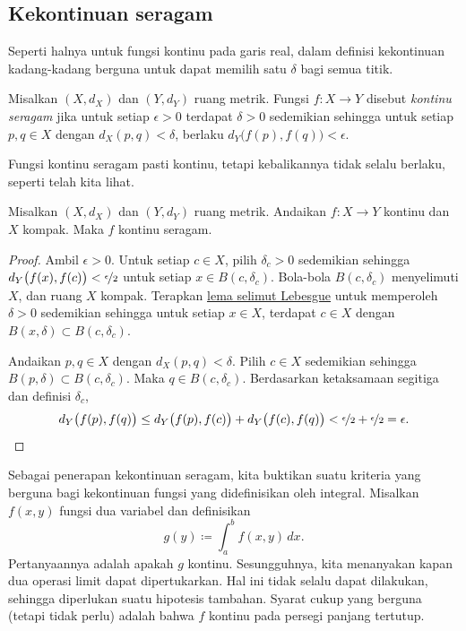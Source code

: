 \subsection{Kekontinuan seragam}

Seperti halnya untuk fungsi kontinu
pada garis real, dalam definisi kekontinuan
kadang-kadang berguna untuk dapat memilih
satu $\delta$ bagi semua titik.

\begin{defn}
Misalkan $(X,d_X)$ dan $(Y,d_Y)$ ruang metrik.
Fungsi $f \colon X \to Y$ disebut
\emph{kontinu seragam}
jika untuk setiap $\epsilon > 0$
terdapat $\delta > 0$ sedemikian sehingga untuk setiap $p,q \in X$ dengan $d_X(p,q) <
\delta$, berlaku
$d_Y\bigl(f(p),f(q)\bigr) < \epsilon$.
\end{defn}

Fungsi kontinu seragam pasti kontinu, tetapi kebalikannya tidak selalu
berlaku, seperti telah kita lihat.

\begin{thm} \label{thm:Xcompactfunifcont}
Misalkan $(X,d_X)$ dan $(Y,d_Y)$ ruang metrik.
Andaikan $f \colon X \to Y$ kontinu dan $X$ kompak.  Maka
$f$ kontinu seragam.
\end{thm}

\begin{proof}
Ambil $\epsilon > 0$.  Untuk setiap $c \in X$, pilih $\delta_c > 0$ sedemikian sehingga
$d_Y\bigl(f(x),f(c)\bigr) < \nicefrac{\epsilon}{2}$
untuk setiap
$x \in B(c,\delta_c)$.
Bola-bola
$B(c,\delta_c)$ menyelimuti $X$, dan ruang $X$ kompak.  
Terapkan \hyperref[ms:lebesgue]{lema selimut Lebesgue} untuk memperoleh 
$\delta > 0$ sedemikian sehingga untuk setiap $x \in X$, terdapat $c \in X$
dengan $B(x,\delta) \subset B(c,\delta_c)$.

Andaikan $p, q \in X$ dengan $d_X(p,q) < \delta$.
Pilih $c \in X$ sedemikian sehingga $B(p,\delta) \subset B(c,\delta_c)$.
Maka $q \in B(c,\delta_c)$.  Berdasarkan ketaksamaan segitiga
dan definisi $\delta_c$,
\begin{equation*}
d_Y\bigl(f(p),f(q)\bigr)
\leq
d_Y\bigl(f(p),f(c)\bigr)
+
d_Y\bigl(f(c),f(q)\bigr)
<
\nicefrac{\epsilon}{2}+
\nicefrac{\epsilon}{2} = \epsilon .  \qedhere
\end{equation*}
\end{proof}

Sebagai penerapan kekontinuan seragam,
kita buktikan suatu kriteria yang berguna bagi
kekontinuan fungsi yang didefinisikan oleh integral.
Misalkan $f(x,y)$ fungsi dua variabel dan definisikan
\begin{equation*}
g(y) \coloneqq \int_a^b f(x,y) \,dx .
\end{equation*}
Pertanyaannya adalah apakah $g$ kontinu.
Sesungguhnya, kita menanyakan kapan dua operasi limit dapat dipertukarkan.
Hal ini tidak selalu dapat dilakukan, sehingga diperlukan suatu hipotesis
tambahan.  Syarat cukup yang berguna (tetapi tidak
perlu) adalah bahwa $f$ kontinu pada persegi panjang tertutup.

